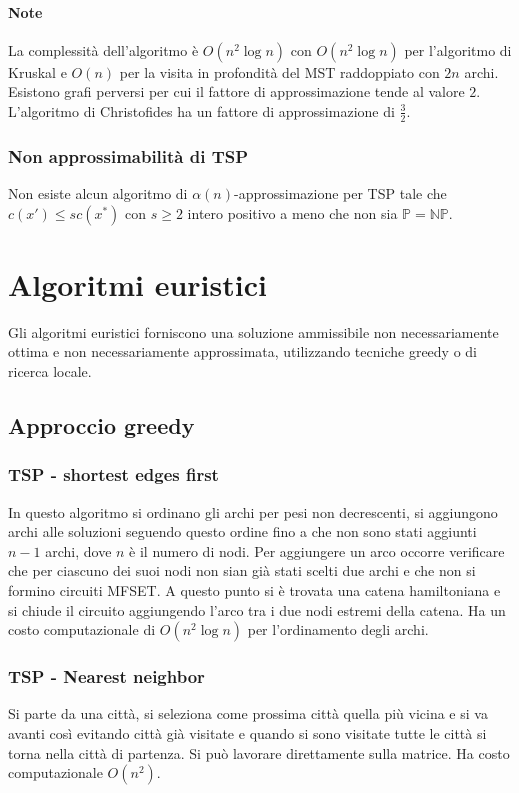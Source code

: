 \paragraph{Note}
La complessit\`a dell'algoritmo \`e $O(n^2\log n)$ con $O(n^2\log n)$ per l'algoritmo di Kruskal e $O(n)$ per la visita in profondit\`a del MST raddoppiato con $2n$ archi. Esistono
grafi perversi per cui il fattore di approssimazione tende al valore $2$. L'algoritmo di Christofides ha un fattore di approssimazione di $\frac{3}{2}$. 
\subsubsection{Non approssimabilit\`a di TSP}
Non esiste alcun algoritmo di $\alpha(n)$-approssimazione per TSP tale che $c(x')\le sc(x^*)$ con $s\ge 2$ intero positivo a meno che non sia $\mathbb{P} = \mathbb{NP}$.
\section{Algoritmi euristici}
Gli algoritmi euristici forniscono una soluzione ammissibile non necessariamente ottima e non necessariamente approssimata, utilizzando tecniche greedy o di ricerca locale.
\subsection{Approccio greedy}
\subsubsection{TSP - shortest edges first}
In questo algoritmo si ordinano gli archi per pesi non decrescenti, si aggiungono archi alle soluzioni seguendo questo ordine fino a che non sono stati aggiunti $n-1$ archi, dove $n$
\`e il numero di nodi. Per aggiungere un arco occorre verificare che per ciascuno dei suoi nodi non sian gi\`a stati scelti due archi e che non si formino circuiti MFSET. A questo punto
si \`e trovata una catena hamiltoniana e si chiude il circuito aggiungendo l'arco tra i due nodi estremi della catena. Ha un costo computazionale di  $O(n^2\log n)$ per l'ordinamento 
degli archi.

\subsubsection{TSP - Nearest neighbor}
Si parte da una citt\`a, si seleziona come prossima citt\`a quella pi\`u vicina e si va avanti cos\`i evitando citt\`a gi\`a visitate e quando si sono visitate tutte le citt\`a si 
torna nella citt\`a di partenza. Si pu\`o lavorare direttamente sulla matrice. Ha costo computazionale $O(n^2)$.

